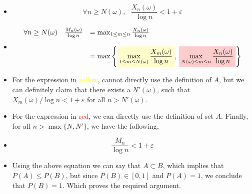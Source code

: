 \documentclass{article}
\newcommand{\highlight}[1]{%
  \colorbox{red!20}{$\displaystyle#1$}}
\newcommand{\highlighty}[1]{%
  \colorbox{yellow!20}{$\displaystyle#1$}}
\begin{document}
\begin{itemize}
\begin{itemize}
                \item[] \begin{equation*}
                            \forall n \geq N(\omega), \, \, \, \, \frac{X_n(\omega)}{\log{n}} < 1 + \varepsilon
                        \end{equation*}
                \item[] \begin{equation*}
                            \begin{array}{lrl}
                                \forall n \geq N(\omega)&\frac{M_n(\omega)}{\log{n}} &= \max_{1\leq m \leq n} \frac{X_n(\omega)}{\log{n}}\\\\
                                & &= \max\left\{\highlighty{\max_{1\leq m \leq N(\omega)} \frac{X_m(\omega)}{\log{n}}}, \, \highlight{\max_{N(\omega)\leq m \leq n} \frac{X_n(\omega)}{\log{n}}}\right\}
                            \end{array}
                        \end{equation*}
                \item For the expression in \textcolor{yellow}{yellow}, cannot directly use the definition of $A$, but we can definitely claim that there exists a $N'(\omega)$, such that $X_m(\omega)/\log{n} < 1 + \varepsilon$ for all $n > N'(\omega)$. 
                \item For the expression in \textcolor{red}{red}, we can directly use the definition of set $A$. Finally, for all $n > \max\{N, N'\}$, we have the following, 
                \item[] \begin{equation*}
                            \frac{M_n}{\log{n}} < 1 + \varepsilon
                        \end{equation*}
                \item Using the above equation we can say that $A \subset B$, which implies that $P(A) \leq P(B)$, but since $P(B)\in[0, 1]$ and $P(A) = 1$, we conclude that $P(B) = 1$. Which proves the required argument. 
            \end{itemize}

\end{itemize}
\newpage
\end{document}
